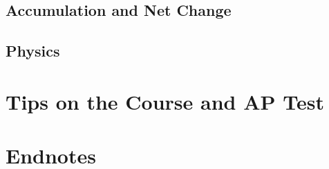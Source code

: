\documentclass{article}
\begin{document}
\subsection{Accumulation and Net Change}
\subsection{Physics}
\newline\vfill
\newpage
\section{Tips on the Course and AP Test}\newpage
\section{Endnotes}
\end{document}
